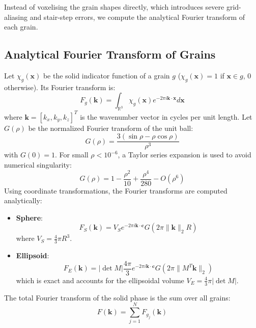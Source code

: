 \documentclass[preprint,12pt]{elsarticle}
\newcommand{\R}{\mathbb{R}}
\newcommand{\x}{\mathbf{x}}
\newcommand{\kvec}{\mathbf{k}}
\newcommand{\cvec}{\mathbf{c}}
\begin{document}
Instead of voxelising the grain shapes directly, which introduces severe grid-aliasing and stair-step errors, we compute the analytical Fourier transform of each grain.

\subsection{Analytical Fourier Transform of Grains}
Let $\chi_g(\x)$ be the solid indicator function of a grain $g$ ($\chi_g(\x) = 1$ if $\x \in g$, $0$ otherwise). Its Fourier transform is:
\begin{equation}
F_g(\kvec) = \int_{\R^3} \chi_g(\x) e^{-2\pi i \kvec \cdot \x} d\x
\end{equation}
where $\kvec = [k_x, k_y, k_z]^T$ is the wavenumber vector in cycles per unit length.
Let $G(\rho)$ be the normalized Fourier transform of the unit ball:
\begin{equation}
\label{eq:unit_ball_ft}
G(\rho) = \frac{3(\sin \rho - \rho \cos \rho)}{\rho^3}
\end{equation}
with $G(0) = 1$. For small $\rho < 10^{-6}$, a Taylor series expansion is used to avoid numerical singularity:
\begin{equation}
G(\rho) = 1 - \frac{\rho^2}{10} + \frac{\rho^4}{280} - O(\rho^6)
\end{equation}
Using coordinate transformations, the Fourier transforms are computed analytically:
\begin{itemize}
    \item \textbf{Sphere}:
    \begin{equation}
    F_S(\kvec) = V_S e^{-2\pi i \kvec \cdot \cvec} G(2\pi \|\kvec\|_2 R)
    \end{equation}
    where $V_S = \frac{4}{3}\pi R^3$.
    \item \textbf{Ellipsoid}:
    \begin{equation}
    \label{eq:ellipsoid_ft}
    F_E(\kvec) = |\det M| \frac{4\pi}{3} e^{-2\pi i \kvec \cdot \cvec} G(2\pi \| M^T \kvec \|_2)
    \end{equation}
    which is exact and accounts for the ellipsoidal volume $V_E = \frac{4}{3}\pi |\det M|$.
\end{itemize}
The total Fourier transform of the solid phase is the sum over all grains:
\begin{equation}
F(\kvec) = \sum_{j=1}^N F_{g_j}(\kvec)
\end{equation}
\end{document}
